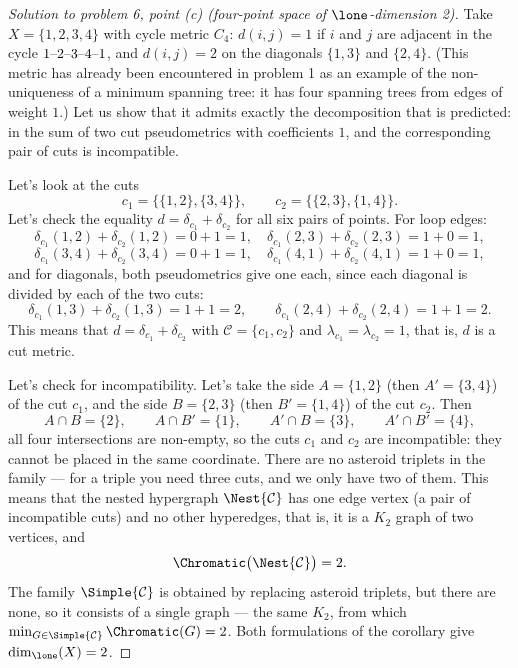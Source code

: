 \documentclass[a4paper,12pt]{report}
\begin{document}
\begin{proof}[Solution to problem \textup{6}, point \textup{(c)} \textup{(}four-point space of $\lone$-dimension \textup{2}\textup{)}]
Take $X=\{1,2,3,4\}$ with cycle metric $C_4$\textup{:} $d(i,j)=1$ if $i$ and $j$ are adjacent in the cycle $1\textup{--}2\textup{--}3\textup{--}4\textup{--}1$, and $d(i,j)=2$ on the diagonals $\{1,3\}$ and $\{2,4\}$. \textup{(}This metric has already been encountered in problem \textup{1} as an example of the non-uniqueness of a minimum spanning tree\textup{:} it has four spanning trees from edges of weight $1$.\textup{)} Let us show that it admits exactly the decomposition that is predicted\textup{:} in the sum of two cut pseudometrics with coefficients $1$, and the corresponding pair of cuts is incompatible.

Let's look at the cuts
\[
c_1=\bigl\{\{1,2\},\{3,4\}\bigr\},\qquad c_2=\bigl\{\{2,3\},\{1,4\}\bigr\}.
\]
Let's check the equality $d=\delta_{c_1}+\delta_{c_2}$ for all six pairs of points. For loop edges\textup{:}
\[
\delta_{c_1}(1,2)+\delta_{c_2}(1,2)=0+1=1,\quad
\delta_{c_1}(2,3)+\delta_{c_2}(2,3)=1+0=1,
\]
\[
\delta_{c_1}(3,4)+\delta_{c_2}(3,4)=0+1=1,\quad
\delta_{c_1}(4,1)+\delta_{c_2}(4,1)=1+0=1,
\]
and for diagonals, both pseudometrics give one each, since each diagonal is divided by each of the two cuts\textup{:}
\[
\delta_{c_1}(1,3)+\delta_{c_2}(1,3)=1+1=2,\qquad
\delta_{c_1}(2,4)+\delta_{c_2}(2,4)=1+1=2.
\]
This means that $d=\delta_{c_1}+\delta_{c_2}$ with $\mathcal C=\{c_1,c_2\}$ and $\lambda_{c_1}=\lambda_{c_2}=1$, that is, $d$ is a cut metric.

Let's check for incompatibility. Let's take the side $A=\{1,2\}$ \textup{(}then $A'=\{3,4\}$\textup{)} of the cut $c_1$, and the side $B=\{2,3\}$ \textup{(}then $B'=\{1,4\}$\textup{)} of the cut $c_2$. Then
\[
A\cap B=\{2\},\qquad A\cap B'=\{1\},\qquad A'\cap B=\{3\},\qquad A'\cap B'=\{4\},
\]
all four intersections are non-empty, so the cuts $c_1$ and $c_2$ are incompatible\textup{:} they cannot be placed in the same coordinate. There are no asteroid triplets in the family --- for a triple you need three cuts, and we only have two of them. This means that the nested hypergraph $\Nest{\mathcal C}$ has one edge vertex \textup{(}a pair of incompatible cuts\textup{)} and no other hyperedges, that is, it is a $K_2$ graph of two vertices, and
\[
\Chromatic\bigl(\Nest{\mathcal C}\bigr)=2.
\]
The family $\Simple{\mathcal C}$ is obtained by replacing asteroid triplets, but there are none, so it consists of a single graph --- the same $K_2$, from which $\min_{G\in\Simple{\mathcal C}}\Chromatic(G)=2$. Both formulations of the corollary give $\dim_{\lone}(X)=2$.


\end{proof}
\end{document}
